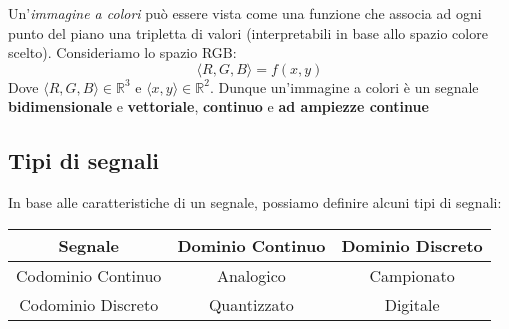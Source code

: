 Un'\textit{immagine a colori} può essere vista come una funzione che associa ad ogni punto del piano una tripletta di valori (interpretabili in base allo spazio colore scelto). Consideriamo lo spazio RGB:
\begin{equation*}
    \langle R,G,B \rangle = f(x,y)
\end{equation*}
Dove $\langle R,G,B \rangle \in \mathbb{R}^3$ e $\langle x,y \rangle \in \mathbb{R}^2 $. Dunque un'immagine a colori è un segnale \textbf{bidimensionale} e \textbf{vettoriale}, \textbf{continuo} e \textbf{ad ampiezze continue}

\subsection{Tipi di segnali}
In base alle caratteristiche di un segnale, possiamo definire alcuni tipi di segnali:
\begin{table}[h]
    \centering
    \begin{tabular}{|c|c|c|}
        \hline
        Segnale & Dominio Continuo & Dominio Discreto \\ \hline
        Codominio Continuo &  Analogico &  Campionato \\ \hline
        Codominio Discreto &  Quantizzato &  Digitale \\ \hline
    \end{tabular}
    \end{table}